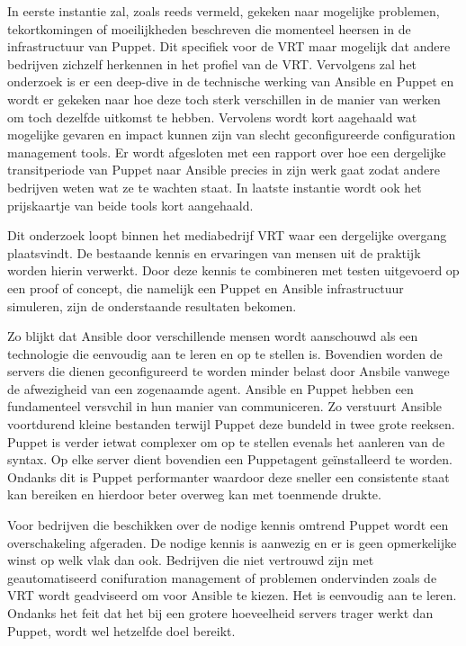 In eerste instantie zal, zoals reeds vermeld, gekeken naar mogelijke problemen, tekortkomingen of moeilijkheden beschreven die momenteel heersen in de infrastructuur van Puppet. Dit specifiek voor de VRT maar mogelijk dat andere bedrijven zichzelf herkennen in het profiel van de VRT. Vervolgens zal het onderzoek is er een deep-dive in de technische werking van Ansible en Puppet en wordt er gekeken naar hoe deze toch sterk verschillen in de manier van werken om toch dezelfde uitkomst te hebben. Vervolens wordt kort aagehaald wat mogelijke gevaren en impact kunnen zijn van slecht geconfigureerde configuration management tools. Er wordt afgesloten met een rapport over hoe een dergelijke transitperiode van Puppet naar Ansible precies in zijn werk gaat zodat andere bedrijven weten wat ze te wachten staat. In laatste instantie wordt ook het prijskaartje van beide tools kort aangehaald.

Dit onderzoek loopt binnen het mediabedrijf VRT waar een dergelijke overgang plaatsvindt. De bestaande kennis en ervaringen van mensen uit de praktijk worden hierin verwerkt. Door deze kennis te combineren met testen uitgevoerd op een proof of concept, die namelijk een Puppet en Ansible infrastructuur simuleren, zijn de onderstaande resultaten bekomen.

Zo blijkt dat Ansible door verschillende mensen wordt aanschouwd als een technologie die eenvoudig aan te leren en op te stellen is. Bovendien worden de servers die dienen geconfigureerd te worden minder belast door Ansbile vanwege de afwezigheid van een zogenaamde agent. Ansible en Puppet hebben een fundamenteel versvchil in hun manier van communiceren. Zo verstuurt Ansible voortdurend kleine bestanden terwijl Puppet deze bundeld in twee grote reeksen. Puppet is verder ietwat complexer om op te stellen evenals het aanleren van de syntax. Op elke server dient bovendien een Puppetagent ge\"installeerd te worden. Ondanks dit is Puppet performanter waardoor deze sneller een consistente staat kan bereiken en hierdoor beter overweg kan met toenmende drukte.

Voor bedrijven die beschikken over de nodige kennis omtrend Puppet wordt een overschakeling afgeraden. De nodige kennis is aanwezig en er is geen opmerkelijke winst op welk vlak dan ook. Bedrijven die niet vertrouwd zijn met geautomatiseerd conifuration management of problemen ondervinden zoals de VRT wordt geadviseerd om voor Ansible te kiezen. Het is eenvoudig aan te leren. Ondanks het feit dat het bij een grotere hoeveelheid servers trager werkt dan Puppet, wordt wel hetzelfde doel bereikt.


